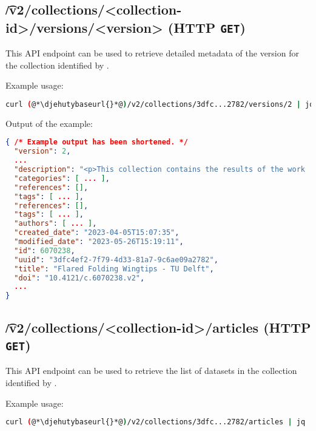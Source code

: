 \subsection{\t{/v2/collections/<collection-id>/versions/<version>} (HTTP \texttt{GET})}

  This API endpoint can be used to retrieve detailed metadata of the version
   for the collection identified by .

  Example usage:
\begin{lstlisting}[language=bash]
curl (@*\djehutybaseurl{}*@)/v2/collections/3dfc...2782/versions/2 | jq
\end{lstlisting}

  Output of the example:
\begin{lstlisting}[language=JSON]
{ /* Example output has been shortened. */
  "version": 2,
  ...
  "description": "<p>This collection contains the results of the work ...",
  "categories": [ ... ],
  "references": [],
  "tags": [ ... ],
  "references": [],
  "tags": [ ... ],
  "authors": [ ... ],
  "created_date": "2023-04-05T15:07:35",
  "modified_date": "2023-05-26T15:19:11",
  "id": 6070238,
  "uuid": "3dfc4ef2-7f79-4d33-81a7-9c6ae09a2782",
  "title": "Flared Folding Wingtips - TU Delft",
  "doi": "10.4121/c.6070238.v2",
  ...
}
\end{lstlisting}

\subsection{\t{/v2/collections/<collection-id>/articles} (HTTP \texttt{GET})}

  This API endpoint can be used to retrieve the list of datasets in the
  collection identified by .

  Example usage:
\begin{lstlisting}[language=bash]
curl (@*\djehutybaseurl{}*@)/v2/collections/3dfc...2782/articles | jq
\end{lstlisting}

